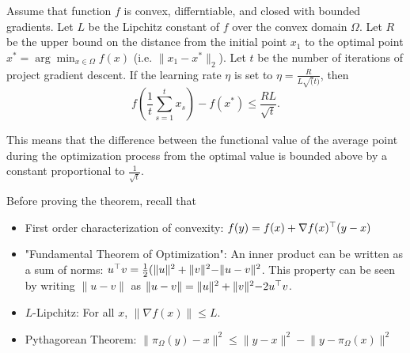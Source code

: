 \begin{theorem}

Assume that function $f$ is convex, differntiable, and closed with bounded
gradients. Let $L$ be the Lipchitz constant of $f$ over the convex domain
$\Omega$. Let $R$ be the upper bound on the distance from the initial point
$x_1$ to the optimal point $x^* = \arg\min_{x \in \Omega} f(x)$ (i.e. $\lVert
x_1 - x^* \rVert_2$). Let $t$ be the number of iterations of project gradient
descent. If the learning rate $\eta$ is set to $\eta=\frac{R}{L \sqrt(t)}$,
then $$f\left(\frac{1}{t}\sum_{s=1}^t x_s\right) - f\left(x^*\right) \leq
\frac{RL}{\sqrt{t}}.$$ \end{theorem}

This means that the difference between the functional value of the average
point during the optimization process from the optimal value is bounded above
by a constant proportional to $\frac{1}{\sqrt{t}}$.

Before proving the theorem, recall that
\begin{itemize}

    \item First order characterization of convexity: $f(y) = f(x) + \nabla
    f(x)^\top (y - x)$

    \item "Fundamental Theorem of Optimization": An inner product can be
    written as a sum of norms: $u^\top v = \frac{1}{2}(\lVert u \rVert^2 +
    \lVert v \lVert^2 - \lVert u - v \rVert^2$. This property can be seen by
    writing $\lVert u - v \rVert$ as $\lVert u - v \rVert = \lVert u \rVert^2 +
    \lVert v \lVert^2 - 2 u^\top v$.

    \item $L$-Lipchitz: For all $x$, $\lVert \nabla f(x) \rVert \leq L$.

    \item Pythagorean Theorem: $\lVert \pi_\Omega (y) - x \rVert^2 \leq \lVert
    y - x \rVert^2 - \lVert y - \pi_\Omega (x) \rVert^2$

\end{itemize}


